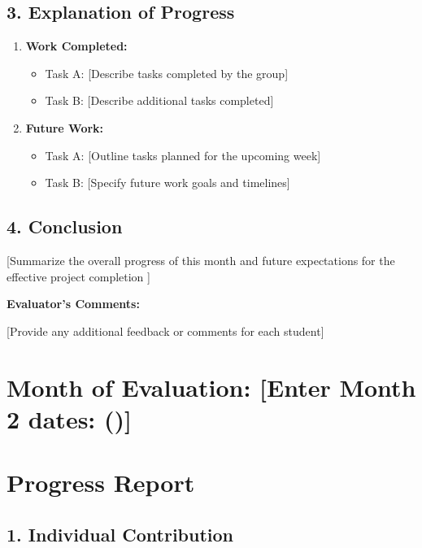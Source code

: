 \subsection*{3. Explanation of Progress}

\begin{enumerate}
	\item \textbf{Work Completed:}
	\begin{itemize}
		\item Task A: [Describe tasks completed by the group]
		\item Task B: [Describe additional tasks completed]
	\end{itemize}
	
	\item \textbf{Future Work:}
	\begin{itemize}
		\item Task A: [Outline tasks planned for the upcoming week]
		\item Task B: [Specify future work goals and timelines]
	\end{itemize}
\end{enumerate}

\subsection*{4. Conclusion}

[Summarize the overall progress of this month  and future expectations for the effective project completion ]

\vspace{1cm}

\textbf{Evaluator's Comments:}

[Provide any additional feedback or comments for each student]


\section*{Month of Evaluation: [Enter Month 2 dates: ()]}

\section*{Progress Report}

\subsection*{1. Individual Contribution}

